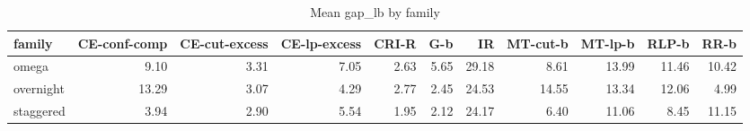 \begin{table}[htbp]
\centering
\small
\caption{Mean gap\_lb by family}
\label{tab:E2b_head_to_head_budgets_b1_by_family}
\begin{tabular}{lrrrrrrrrrr}
\toprule
family & CE-conf-comp & CE-cut-excess & CE-lp-excess & CRI-R & G-b & IR & MT-cut-b & MT-lp-b & RLP-b & RR-b \\
\midrule
omega & 9.10 & 3.31 & 7.05 & 2.63 & 5.65 & 29.18 & 8.61 & 13.99 & 11.46 & 10.42 \\
overnight & 13.29 & 3.07 & 4.29 & 2.77 & 2.45 & 24.53 & 14.55 & 13.34 & 12.06 & 4.99 \\
staggered & 3.94 & 2.90 & 5.54 & 1.95 & 2.12 & 24.17 & 6.40 & 11.06 & 8.45 & 11.15 \\
\bottomrule
\end{tabular}
\end{table}
